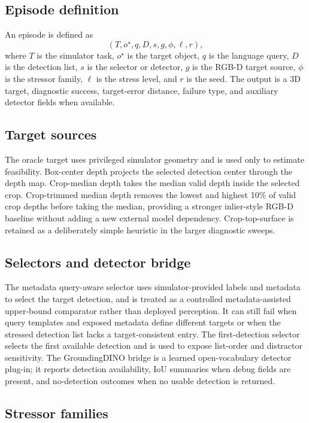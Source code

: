 \subsection{Episode definition}

An episode is defined as
\[
(T, o^\star, q, D, s, g, \phi, \ell, r),
\]
where \(T\) is the simulator task, \(o^\star\) is the target object, \(q\) is the language query, \(D\) is the detection list, \(s\) is the selector or detector, \(g\) is the RGB-D target source, \(\phi\) is the stressor family, \(\ell\) is the stress level, and \(r\) is the seed. The output is a 3D target, diagnostic success, target-error distance, failure type, and auxiliary detector fields when available.

\subsection{Target sources}

The oracle target uses privileged simulator geometry and is used only to estimate feasibility. Box-center depth projects the selected detection center through the depth map. Crop-median depth takes the median valid depth inside the selected crop. Crop-trimmed median depth removes the lowest and highest 10\% of valid crop depths before taking the median, providing a stronger inlier-style RGB-D baseline without adding a new external model dependency. Crop-top-surface is retained as a deliberately simple heuristic in the larger diagnostic sweeps.

\subsection{Selectors and detector bridge}

The metadata query-aware selector uses simulator-provided labels and metadata to select the target detection, and is treated as a controlled metadata-assisted upper-bound comparator rather than deployed perception. It can still fail when query templates and exposed metadata define different targets or when the stressed detection list lacks a target-consistent entry. The first-detection selector selects the first available detection and is used to expose list-order and distractor sensitivity. The GroundingDINO bridge is a learned open-vocabulary detector plug-in; it reports detection availability, IoU summaries when debug fields are present, and no-detection outcomes when no usable detection is returned.

\subsection{Stressor families}

